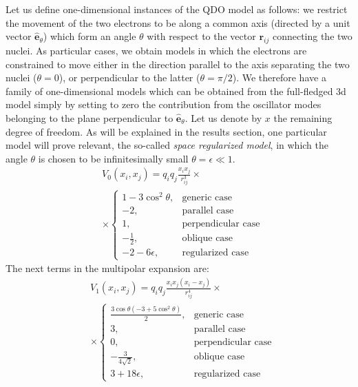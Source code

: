 \documentclass[reprint, amsmath, amssymb, aps]{revtex4-2}
\begin{document}
        Let us define one-dimensional instances of the QDO model as follows: we restrict the movement of the two electrons to be along a common axis (directed by a unit vector $\hat{\bm e}_\theta$) which form an angle $\theta$ with respect to the vector $\bm r_{ij}$ connecting the two nuclei. As particular cases, we obtain models in which the electrons are constrained to move either in the direction parallel to the axis separating the two nuclei ($\theta=0$), or perpendicular to the latter ($\theta=\pi/2$). We therefore have a family of one-dimensional models which can be obtained from the full-fledged 3d model simply by setting to zero the contribution from the oscillator modes belonging to the plane perpendicular to $\hat{\bm e}_\theta$. Let us denote by $x$ the remaining degree of freedom. As will be explained in the results section, one particular model will prove relevant, the so-called \textit{space regularized model}, in which the angle $\theta$ is chosen to be infinitesimally small $\theta=\epsilon\ll 1$.
        \begin{equation}
        \begin{split}
            &V_0(x_i, x_j) = q_iq_j\frac{x_ix_j}{r_{ij}^3}\times\\
            &\times\begin{cases}
                1-3\cos^2\theta, & \text{generic case} \\
                -2, & \text{parallel case} \\
                1, & \text{perpendicular case} \\
                -\frac{1}{2}, & \text{oblique case} \\
                -2-6\epsilon, & \text{regularized case}
            \end{cases}
        \end{split}
        \end{equation}
        The next terms in the multipolar expansion are:
        \begin{equation}
        \begin{split}
            &V_1(x_i, x_j) = q_iq_j\frac{x_ix_j(x_i-x_j)}{r_{ij}^4}\times\\
            &\times\begin{cases}
                \frac{3\cos\theta(-3+5\cos^2\theta)}{2}, & \text{generic case} \\
                3, & \text{parallel case} \\
                0, & \text{perpendicular case} \\
                -\frac{3}{4\sqrt 2}, & \text{oblique case} \\
                3+18\epsilon, & \text{regularized case}
            \end{cases}
        \end{split}
        \end{equation}
\end{document}
